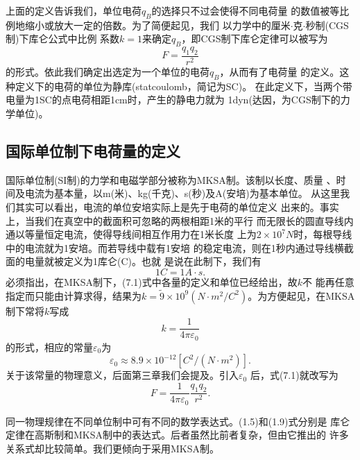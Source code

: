 上面的定义告诉我们，单位电荷$q_B$的选择只不过会使得不同电荷量
的数值被等比例地缩小或放大一定的倍数。为了简便起见，我们
以力学中的厘米$\cdot $克$\cdot $秒制(CGS制)下库仑公式中比例
系数$k=1$来确定$q_B$，即CGS制下库仑定律可以被写为
\begin{equation}
    F=\frac{q_1q_2}{r^2}
\end{equation}
的形式。依此我们确定出选定为一个单位的电荷$q_B$，从而有了电荷量
的定义。这种定义下的电荷的单位为静库(statcoulomb，简记为SC)。
在此定义下，当两个带电量为1SC的点电荷相距1cm时，产生的静电力就为
1dyn(达因，为CGS制下的力学单位)。
\subsection{国际单位制下电荷量的定义}
国际单位制(SI制)的力学和电磁学部分被称为MKSA制。该制以长度、质量
、时间及电流为基本量，以m(米)、kg(千克)、s(秒)及A(安培)为基本单位。
从这里我们其实可以看出，电流的单位安培实际上是先于电荷的单位定义
出来的。事实上，当我们在真空中的截面积可忽略的两根相距1米的平行
而无限长的圆直导线内通以等量恒定电流，使得导线间相互作用力在1米长度
上为$2\times 10^7N$时，每根导线中的电流就为1安培。而若导线中载有1安培
的稳定电流，则在1秒内通过导线横截面的电量就被定义为1库仑(C)。也就
是说在此制下，我们有
\begin{equation}
    1C=1A\cdot s.
\end{equation}
必须指出，在MKSA制下，(7.1)式中各量的定义和单位已经给出，故$k$不 
能再任意指定而只能由计算求得，结果为$k=\widetilde{9}\times 10^9
(N\cdot m^2/C^2)$。为方便起见，在MKSA制下常将$k$写成
\begin{equation}
    k=\frac{1}{4\pi \varepsilon_0}
\end{equation}
的形式，相应的常量$\varepsilon_0$为 
\begin{equation}
    \varepsilon_0\approx 8.9\times 10^{-12}[C^2/(N\cdot m^2)].
\end{equation}
关于该常量的物理意义，后面第三章我们会提及。引入$\varepsilon_0$
后，式(7.1)就改写为
\begin{equation}
    F=\frac{1}{4\pi \varepsilon_0}\frac{q_1q_2}{r^2}.
\end{equation}

同一物理规律在不同单位制中可有不同的数学表达式。(1.5)和(1.9)式分别是
库仑定律在高斯制和MKSA制中的表达式。后者虽然比前者复杂，但由它推出的
许多关系式却比较简单。我们更倾向于采用MKSA制。
